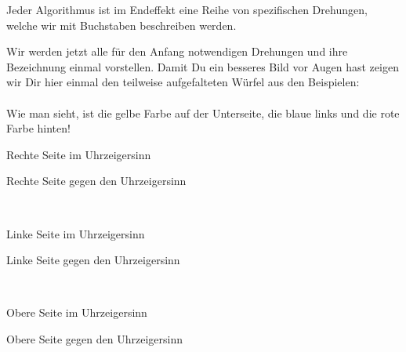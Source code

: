 Jeder Algorithmus ist im Endeffekt eine Reihe von spezifischen Drehungen, welche wir mit Buchstaben beschreiben werden.

Wir werden jetzt alle für den Anfang notwendigen Drehungen und ihre Bezeichnung einmal vorstellen.
Damit Du ein besseres Bild vor Augen hast zeigen wir Dir hier einmal den teilweise aufgefalteten Würfel aus den Beispielen:\\[1em]

\RubikCubeSolved%
\\[1em]

Wie man sieht, ist die gelbe Farbe auf der Unterseite, die blaue links und die rote Farbe hinten!

\begin{instruction}{Rechte Seite im Uhrzeigersinn}
  \vspace{1.3em}
  \RubikCubeSolved%
  \quad{}
\end{instruction}
\hfil
\begin{instruction}{Rechte Seite gegen den Uhrzeigersinn}
  \RubikCubeSolved%
  \quad{}
\end{instruction}\\[3em]
\begin{instruction}{Linke Seite im Uhrzeigersinn}
  \vspace{1.3em}
  \RubikCubeSolved%
  \quad{}
\end{instruction}
\hfil
\begin{instruction}{Linke Seite gegen den Uhrzeigersinn}
  \RubikCubeSolved%
  \quad{}
\end{instruction}
\\[3em]
\begin{instruction}{Obere Seite im Uhrzeigersinn}
  \vspace{1.3em}
  \RubikCubeSolved%
  \quad{}
\end{instruction}
\hfil
\begin{instruction}{Obere Seite gegen den Uhrzeigersinn}
  \RubikCubeSolved%
  \quad{}
\end{instruction}
